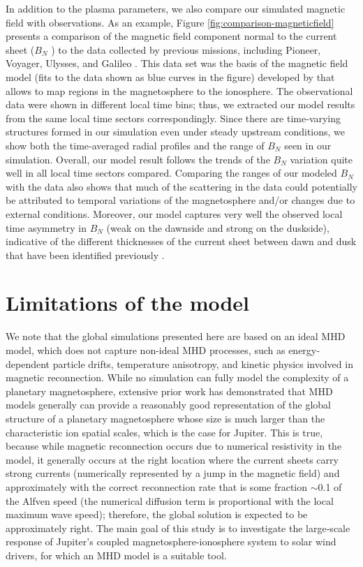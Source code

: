 In addition to the plasma parameters, we also compare our simulated magnetic field with observations. As an example, Figure \ref{fig:comparison-magneticfield} presents a comparison of the magnetic field component normal to the current sheet ($B_N$ ) to the data collected by previous missions, including Pioneer, Voyager, Ulysses, and Galileo \cite{Vogt2011a}. This data set was the basis of the magnetic field model (fits to the data shown as blue curves in the figure) developed by \cite{Vogt2011a} that allows to map regions in the magnetosphere to the ionosphere. The observational data were shown in different local time bins; thus, we extracted our model results from the same local time sectors correspondingly. Since there are time‐varying structures formed in our simulation even under steady upstream conditions, we show both the time‐averaged radial profiles and the range of $B_N$ seen in our simulation. Overall, our model result follows the trends of the $B_N$ variation quite well in all local time sectors compared. Comparing the ranges of our modeled $B_N$ with the data also shows that much of the scattering in the data could potentially be attributed to temporal variations of the magnetosphere and/or changes due to external conditions. Moreover, our model captures very well the observed local time asymmetry in $B_N$ (weak on the dawnside and strong on the duskside), indicative of the different thicknesses of the current sheet between dawn and dusk that have been identified previously \cite{Khurana2005,Kivelson2002a}.

\section{Limitations of the model}
We note that the global simulations presented here are based on an ideal MHD model, which does not capture non-ideal MHD processes, such as energy‐dependent particle drifts, temperature anisotropy, and kinetic physics involved in magnetic reconnection. While no simulation can fully model the complexity of a planetary magnetosphere, extensive prior work has demonstrated that MHD models generally can provide a reasonably good representation of the global structure of a planetary magnetosphere whose size is much larger than the characteristic ion spatial scales, which is the case for Jupiter. This is true, because while magnetic reconnection occurs due to numerical resistivity in the model, it generally occurs at the right location where the current sheets carry strong currents (numerically represented by a jump in the magnetic field) and approximately with the correct reconnection rate that is some fraction $\sim$0.1 of the Alfven speed (the numerical diffusion term is proportional with the local maximum wave speed); therefore, the global solution is expected to be approximately right. The main goal of this study is to investigate the large‐scale response of Jupiter's coupled magnetosphere‐ionosphere system to solar wind drivers, for which an MHD model is a suitable tool.

